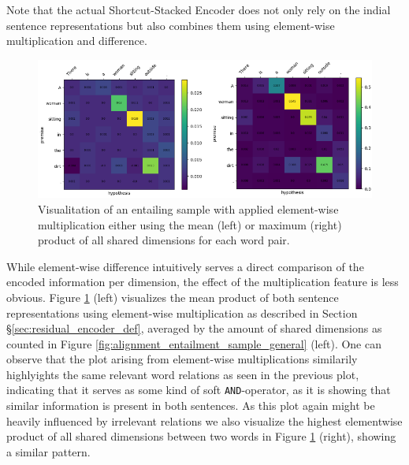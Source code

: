 \noindent
Note that the actual Shortcut-Stacked Encoder does not only rely on the indial sentence representations but also combines them using element-wise multiplication and difference. 
\begin{figure}[tph!]
\centering
	\includegraphics[totalheight=7cm]{fig/alignment_entailment_sample_mult.png}
	\caption{Visualitation of an entailing sample with applied element-wise multiplication either using the mean (left) or maximum (right) product of all shared dimensions for each word pair.}
	\label{fig:alignment_entailment_sample_mult}
\end{figure}
While element-wise difference intuitively serves a direct comparison of the encoded information per dimension, the effect of the multiplication feature is less obvious. Figure \ref{fig:alignment_entailment_sample_mult} (left) visualizes the mean product of both sentence representations using element-wise multiplication as described in Section §\ref{sec:residual_encoder_def}, averaged by the amount of shared dimensions as counted in Figure \ref{fig:alignment_entailment_sample_general} (left). One can observe that the plot arising from element-wise multiplications similarily highlyights the same relevant word relations as seen in the previous plot, indicating that it serves as some kind of soft \texttt{AND}-operator, as it is showing that similar information is present in both sentences. As this plot again might be heavily influenced by irrelevant relations we also visualize the highest elementwise product of all shared dimensions between two words in Figure \ref{fig:alignment_entailment_sample_mult} (right), showing a similar pattern.

